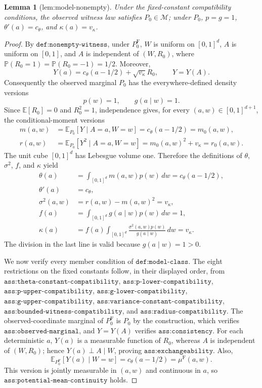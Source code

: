 \documentclass{article}
\newtheorem{lemma}{Lemma}
\begin{document}
\begin{lemma}[lem:model-nonempty]\label{lem:model-nonempty}
Under the fixed-constant compatibility conditions, the observed witness law satisfies \(P_0\in\mathcal M\); under \(P_0\), \(p=g=1\), \(\theta'(a)=c_{\theta}\), and \(\kappa(a)=v_{\kappa}\).
\end{lemma}
\begin{proof}
By \(\texttt{def:nonempty-witness}\), under \(P_0^{\mathrm F}\), \(W\) is uniform on \([0,1]^d\), \(A\) is uniform on \([0,1]\), and \(A\) is independent of \((W,R_0)\), where \(\mathbb P(R_0=1)=\mathbb P(R_0=-1)=1/2\). Moreover,
\[
Y(a)=c_{\theta}(a-1/2)+\sqrt{v_{\kappa}}R_0,
\qquad
Y=Y(A).
\]
Consequently the observed marginal \(P_0\) has the everywhere-defined density versions
\[
p(w)=1,
\qquad
g(a\mid w)=1.
\]
Since \(\mathbb E[R_0]=0\) and \(R_0^2=1\), independence gives, for every \((a,w)\in[0,1]^{d+1}\), the conditional-moment versions
\[
\begin{aligned}
m(a,w)
&=\mathbb E_{P_0}[Y\mid A=a,W=w]
=c_{\theta}(a-1/2)=m_0(a,w),\\
r(a,w)
&=\mathbb E_{P_0}[Y^2\mid A=a,W=w]
=m_0(a,w)^2+v_{\kappa}=r_0(a,w).
\end{aligned}
\]
The unit cube \([0,1]^d\) has Lebesgue volume one. Therefore the definitions of \(\theta\), \(\sigma^2\), \(f\), and \(\kappa\) yield
\[
\begin{aligned}
\theta(a)
&=\int_{[0,1]^d}m(a,w)p(w)\,dw
=c_{\theta}(a-1/2),\\
\theta'(a)&=c_{\theta},\\
\sigma^2(a,w)&=r(a,w)-m(a,w)^2=v_{\kappa},\\
f(a)&=\int_{[0,1]^d}g(a\mid w)p(w)\,dw=1,\\
\kappa(a)
&=f(a)\int_{[0,1]^d}\frac{\sigma^2(a,w)p(w)}{g(a\mid w)}\,dw
=v_{\kappa}.
\end{aligned}
\]
The division in the last line is valid because \(g(a\mid w)=1>0\).

We now verify every member condition of \(\texttt{def:model-class}\). The eight restrictions on the fixed constants follow, in their displayed order, from \(\texttt{ass:theta-constant-compatibility}\), \(\texttt{ass:p-lower-compatibility}\), \(\texttt{ass:p-upper-compatibility}\), \(\texttt{ass:g-lower-compatibility}\), \(\texttt{ass:g-upper-compatibility}\), \(\texttt{ass:variance-constant-compatibility}\), \(\texttt{ass:bounded-witness-compatibility}\), and \(\texttt{ass:radius-compatibility}\). The observed-coordinate marginal of \(P_0^{\mathrm F}\) is \(P_0\) by the construction, which verifies \(\texttt{ass:observed-marginal}\), and \(Y=Y(A)\) verifies \(\texttt{ass:consistency}\). For each deterministic \(a\), \(Y(a)\) is a measurable function of \(R_0\), whereas \(A\) is independent of \((W,R_0)\); hence \(Y(a)\perp A\mid W\), proving \(\texttt{ass:exchangeability}\). Also,
\[
\mathbb E_{P_0^{\mathrm F}}[Y(a)\mid W=w]
=c_{\theta}(a-1/2)=\mu^{\mathrm F}(a,w).
\]
This version is jointly measurable in \((a,w)\) and continuous in \(a\), so \(\texttt{ass:potential-mean-continuity}\) holds.


\end{proof}
\end{document}
